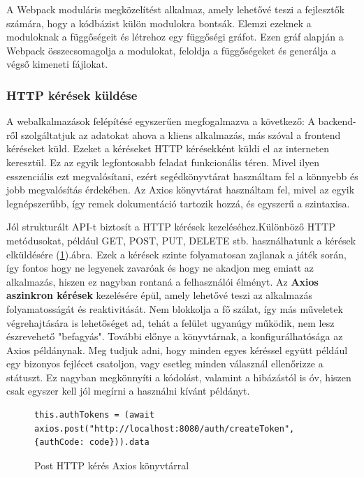 \documentclass[a4paper,twoside]{article}
\begin{document}
A Webpack moduláris megközelítést alkalmaz, amely lehetővé teszi a fejlesztők számára,
hogy a kódbázist külön modulokra bontsák. Elemzi ezeknek a moduloknak a függőségeit
és létrehoz egy függőségi gráfot. Ezen gráf alapján a Webpack összecsomagolja a
modulokat, feloldja a függőségeket és generálja a végső kimeneti fájlokat.

\subsubsection{HTTP kérések küldése}
A webalkalmazások felépítésé egyszerűen megfogalmazva a következő: A backend-ről szolgáltatjuk az adatokat ahova a kliens alkalmazás, más szóval a frontend kéréseket küld. Ezeket a kéréseket HTTP kérésekként küldi el az interneten keresztül. Ez az egyik legfontosabb feladat funkcionális téren. Mivel ilyen esszenciális 
ezt megvalósítani, ezért segédkönyvtárat használtam fel a könnyebb és jobb megvalósítás érdekében. Az Axios\cite{axios} könyvtárat használtam fel, mivel az egyik legnépszerűbb, így remek dokumentáció tartozik hozzá, és egyszerű a szintaxisa. 

Jól strukturált API-t biztosít a HTTP kérések kezeléséhez.Különböző HTTP metódusokat, például GET, POST,
PUT, DELETE stb. használhatunk a kérések elküldésére (\ref{axios}).ábra. Ezek a kérések szinte folyamatosan zajlanak a játék során, így fontos hogy ne legyenek zavaróak és hogy ne akadjon meg emiatt az alkalmazás, hiszen ez nagyban rontaná a felhasználói élményt. Az \textbf{Axios aszinkron kérések} kezelésére épül, amely
lehetővé teszi az alkalmazás folyamatosságát és reaktivitását. Nem blokkolja a fő
szálat, így más műveletek végrehajtására is lehetőséget ad, tehát a felület ugyanúgy működik, nem lesz észrevehető "befagyás".
További előnye a könyvtárnak, a konfigurálhatósága az Axios példánynak. Meg tudjuk adni, hogy minden egyes kéréssel együtt például egy bizonyos fejlécet csatoljon, vagy esetleg minden válasznál ellenőrizze a státuszt. Ez nagyban megkönnyíti a kódolást, valamint a hibázástól is óv, hiszen csak egyszer kell jól megírni a használni kívánt példányt. 
\begin{figure}
	\caption{Post HTTP kérés Axios könyvtárral}
	\begin{adjustwidth}{0cm}{10cm}
		\begin{minipage}{\textwidth}
			\begin{lstlisting}[style=javascriptStyle]
					this.authTokens = (await axios.post("http://localhost:8080/auth/createToken", {authCode: code})).data
					\end{lstlisting}
				\end{minipage}
	\end{adjustwidth}
\label{axios}
\end{figure}
\end{document}
